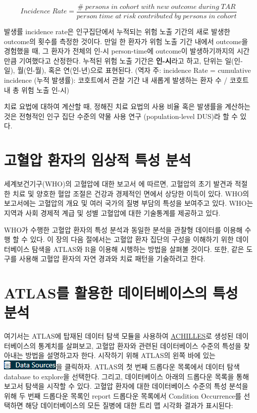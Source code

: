 \documentclass[10.5pt]{book}
\theoremstyle{definition}
\theoremstyle{definition}
\theoremstyle{definition}
\theoremstyle{remark}
\begin{document}
\[
Incidence\;Rate = \frac{\#\;persons\;in\;cohort\;with\;new\;outcome\;during\;TAR}{person\;time\;at\;risk\;contributed\;by\;persons\;in\;cohort}
\]

발생률 incidence rate은 인구집단에서 누적되는 위험 노출 기간의 새로
발생한 outcome의 횟수를 측정한 것이다. 만일 한 환자가 위험 노출 기간
내에서 outcome을 경험했을 때, 그 환자가 전체의 인-시 person-time에
outcome이 발생하기까지의 시간만큼 기여했다고 산정한다. 누적된 위험 노출
기간은 \textbf{인-시}라고 하고, 단위는 일(인-일), 월(인-월), 혹은
연(인-년)으로 표현된다.   (역자
주: incidence Rate = cumulative incidence (누적 발생률): 코호트에서 관찰
기간 내 새롭게 발생하는 환자 수 / 코호트 내 총 위험 노출 인-시)

치료 요법에 대하여 계산할 때, 정해진 치료 요법의 사용 비율 혹은 발생률을
계산하는 것은 전형적인 인구 집단 수준의 약물 사용 연구 (population-level
DUS)라 할 수 있다.

\section{고혈압 환자의 임상적 특성 분석}\label{----}

세계보건기구(WHO)의 고혈압에 대한 보고서 \citep{WHOHypertension} 에
따르면, 고혈압의 초기 발견과 적절한 치료 및 양호한 혈압 조절은 건강과
경제적인 면에서 상당한 이득이 있다. WHO의 보고서에는 고혈압의 개요 및
여러 국가의 질병 부담의 특성을 보여주고 있다. WHO는 지역과 사회 경제적
계급 및 성별 고혈압에 대한 기술통계를 제공하고 있다.

WHO가 수행한 고혈압 환자의 특성 분석과 동일한 분석을 관찰형 데이터를
이용해 수행 할 수 있다. 이 장의 다음 절에서는 고혈압 환자 집단의 구성을
이해하기 위한 데이터베이스 탐색을 ATLAS와 R을 이용해 시행하는 방법을
살펴볼 것이다. 또한, 같은 도구를 사용해 고혈압 환자의 자연 경과와 치료
패턴을 기술하려고 한다.

\section{ATLAS를 활용한 데이터베이스의 특성 분석}\label{atlas----}

여기서는 ATLAS에 탑재된 데이터 탐색 모듈을 사용하여
\href{https://github.com/OHDSI/Achilles}{ACHILLES}로 생성된
데이터베이스의 통계치를 살펴보고, 고혈압 환자와 관련된 데이터베이스
수준의 특성을 찾아내는 방법을 설명하고자 한다. 시작하기 위해 ATLAS의
왼쪽 바에 있는
\includegraphics{images/Characterization/atlasDataSourcesMenuItem.png}을
클릭하자. ATLAS의 첫 번째 드롭다운 목록에서 데이터 탐색 database to
explore을 선택한다. 그리고, 데이터베이스 아래의 드롭다운 목록을 통해
보고서 탐색을 시작할 수 있다. 고혈압 환자에 대한 데이터베이스 수준의
특성 분석을 위해 두 번째 드롭다운 목록인 report 드롭다운 목록에서
Condition Occurrence를 선택하면 해당 데이터베이스의 모든 질병에 대한
트리 맵 시각화 결과가 표시된다:
\end{document}
